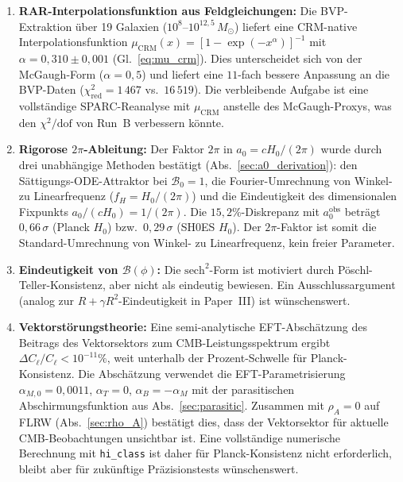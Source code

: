 \documentclass[aps,prd,twocolumn,superscriptaddress,nofootinbib]{revtex4-2}
\begin{document}
\begin{enumerate}
\item \textbf{RAR-Interpolationsfunktion aus Feldgleichungen:} Die BVP-Extraktion \"uber 19 Galaxien ($10^8$--$10^{12{,}5}\,M_\odot$) liefert eine CRM-native Interpolationsfunktion $\mu_{\mathrm{CRM}}(x) = [1 - \exp(-x^\alpha)]^{-1}$ mit $\alpha = 0{,}310 \pm 0{,}001$ (Gl.~\ref{eq:mu_crm}). Dies unterscheidet sich von der McGaugh-Form ($\alpha = 0{,}5$) und liefert eine $11$-fach bessere Anpassung an die BVP-Daten ($\chi^2_{\mathrm{red}} = 1\,467$ vs.\ $16\,519$). Die verbleibende Aufgabe ist eine vollst\"andige SPARC-Reanalyse mit $\mu_{\mathrm{CRM}}$ anstelle des McGaugh-Proxys, was den $\chi^2/\mathrm{dof}$ von Run~B verbessern k\"onnte.

\item \textbf{Rigorose $2\pi$-Ableitung:} Der Faktor $2\pi$ in $a_0 = cH_0/(2\pi)$ wurde durch drei unabh\"angige Methoden best\"atigt (Abs.~\ref{sec:a0_derivation}): den S\"attigungs-ODE-Attraktor bei $\mathcal{B}_0 = 1$, die Fourier-Umrechnung von Winkel- zu Linearfrequenz ($f_H = H_0/(2\pi)$) und die Eindeutigkeit des dimensionalen Fixpunkts $a_0/(cH_0) = 1/(2\pi)$. Die $15{,}2\%$-Diskrepanz mit $a_0^{\mathrm{obs}}$ betr\"agt $0{,}66\,\sigma$ (Planck $H_0$) bzw.\ $0{,}29\,\sigma$ (SH0ES $H_0$). Der $2\pi$-Faktor ist somit die Standard-Umrechnung von Winkel- zu Linearfrequenz, kein freier Parameter.

\item \textbf{Eindeutigkeit von $\mathcal{B}(\phi)$:} Die $\mathrm{sech}^2$-Form ist motiviert durch P\"oschl-Teller-Konsistenz, aber nicht als eindeutig bewiesen. Ein Ausschlussargument (analog zur $R + \gamma R^2$-Eindeutigkeit in Paper~III) ist w\"unschenswert.

\item \textbf{Vektorst\"orungstheorie:} Eine semi-analytische EFT-Absch\"atzung des Beitrags des Vektorsektors zum CMB-Leistungsspektrum ergibt $\Delta C_\ell / C_\ell < 10^{-11}\%$, weit unterhalb der Prozent-Schwelle f\"ur Planck-Konsistenz. Die Absch\"atzung verwendet die EFT-Parametrisierung $\alpha_{M,0} = 0{,}0011$, $\alpha_T = 0$, $\alpha_B = -\alpha_M$ mit der parasitischen Abschirmungsfunktion aus Abs.~\ref{sec:parasitic}. Zusammen mit $\rho_A = 0$ auf FLRW (Abs.~\ref{sec:rho_A}) best\"atigt dies, dass der Vektorsektor f\"ur aktuelle CMB-Beobachtungen unsichtbar ist. Eine vollst\"andige numerische Berechnung mit \texttt{hi\_class} ist daher f\"ur Planck-Konsistenz nicht erforderlich, bleibt aber f\"ur zuk\"unftige Pr\"azisionstests w\"unschenswert.


\end{enumerate}
\end{document}
